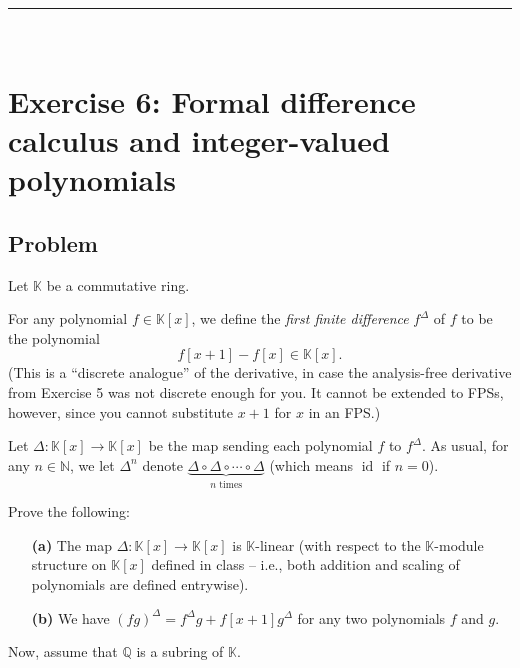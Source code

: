 \documentclass[paper=a4, fontsize=12pt]{scrartcl}%
\theoremstyle{plainsl}
\theoremstyle{definition}
\theoremstyle{remark}
\begin{document}
\rule{\linewidth}{0.3pt} \\[0.4cm]

\section{Exercise 6: Formal difference calculus and integer-valued
polynomials}

\subsection{Problem}

Let $\mathbb{K}$ be a commutative ring.

For any polynomial $f \in\mathbb{K}\left[  x \right]  $, we define the
\textit{first finite difference} $f^{\Delta}$ of $f$ to be the polynomial
\[
f \left[  x+1 \right]  - f \left[  x \right]  \in\mathbb{K}\left[  x \right]
.
\]
(This is a ``discrete analogue'' of the derivative, in case the analysis-free
derivative from Exercise 5 was not discrete enough for you. It cannot be
extended to FPSs, however, since you cannot substitute $x+1$ for $x $ in an FPS.)

Let $\Delta: \mathbb{K}\left[  x \right]  \to\mathbb{K}\left[  x \right]  $ be
the map sending each polynomial $f$ to $f^{\Delta}$. As usual, for any $n
\in\mathbb{N}$, we let $\Delta^{n}$ denote $\underbrace{\Delta\circ\Delta
\circ\cdots\circ\Delta}_{n \text{ times}}$ (which means $\operatorname{id}$ if
$n = 0$).

Prove the following:

\begin{enumerate}
\item[\textbf{(a)}] The map $\Delta: \mathbb{K}\left[  x \right]
\to\mathbb{K}\left[  x \right]  $ is $\mathbb{K}$-linear (with respect to the
$\mathbb{K}$-module structure on $\mathbb{K}\left[  x \right]  $ defined in
class -- i.e., both addition and scaling of polynomials are defined entrywise).

\item[\textbf{(b)}] We have $\left(  fg \right)  ^{\Delta}= f^{\Delta}g +
f\left[  x+1 \right]  g^{\Delta}$ for any two polynomials $f$ and $g$.
\end{enumerate}

Now, assume that $\mathbb{Q}$ is a subring of $\mathbb{K}$.
\end{document}
